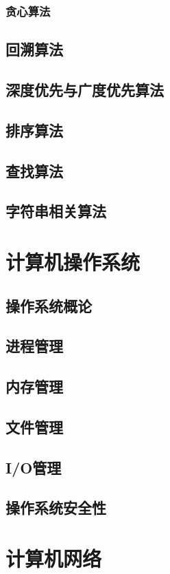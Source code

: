 \documentclass[UTF8]{ctexbook}
\begin{document}
            \subsection{贪心算法}
        \section{回溯算法}
        \section{深度优先与广度优先算法}
        \section{排序算法}
        \section{查找算法}
        \section{字符串相关算法}
    \newpage
    \chapter{计算机操作系统}
        \section{操作系统概论}
        \section{进程管理}
        \section{内存管理}
        \section{文件管理}
        \section{I/O管理}
        \section{操作系统安全性}

    \newpage
    \chapter{计算机网络}
\end{document}
